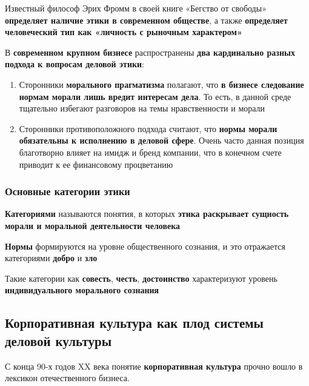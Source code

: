 Известный философ Эрих Фромм в своей книге «Бегство от свободы» \textbf{определяет наличие этики в современном обществе}, а также \textbf{определяет человеческий тип как «личность с рыночным характером»}

В \textbf{современном крупном бизнесе} распространены \textbf{два кардинально разных подхода к вопросам деловой этики}:

\begin{enumerate}
    \item Сторонники \textbf{морального прагматизма} полагают, что \textbf{в бизнесе следование нормам морали лишь вредит интересам дела}. То есть, в данной среде тщательно избегают разговоров на темы нравственности и морали
    \item Сторонники противоположного подхода считают, что \textbf{нормы морали обязательны к исполнению в деловой сфере}. Очень часто данная позиция благотворно влияет на имидж и бренд компании, что в конечном счете приводит к ее финансовому процветанию
\end{enumerate}

\subsubsection{Основные категории этики}

\begin{multienumerate}
\end{multienumerate}

\textbf{Категориями} называются понятия, в которых \textbf{этика раскрывает сущность морали и моральной деятельности человека}

\textbf{Нормы} формируются на уровне общественного сознания, и это отражается категориями \textbf{добро} и \textbf{зло}

Такие категории как \textbf{совесть}, \textbf{честь}, \textbf{достоинство} характеризуют уровень \textbf{индивидуального морального сознания}

\subsection{Корпоративная культура как плод системы деловой культуры}

С конца 90-х годов XX века понятие \textbf{корпоративная культура} прочно вошло в лексикон отечественного бизнеса.

